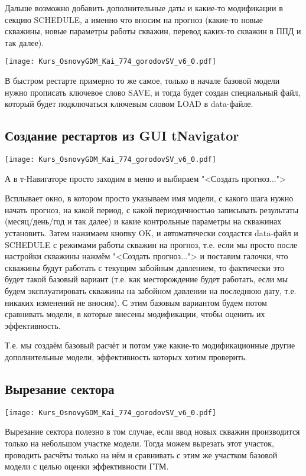 \documentclass[main.tex]{subfiles}
\begin{document}
Дальше возможно добавить дополнительные даты и какие-то модификации в секцию SCHEDULE, а именно что вносим на прогноз (какие-то новые скважины, новые параметры работы скважин, перевод каких-то скважин в ППД и так далее).

\texttt{[image: Kurs\_OsnovyGDM\_Kai\_774\_gorodovSV\_v6\_0.pdf]}

В быстром рестарте примерно то же самое, только в начале базовой модели нужно прописать ключевое слово SAVE, и тогда будет создан специальный файл, который будет подключаться ключевым словом LOAD в data-файле.

\subsection{Создание рестартов из GUI tNavigator}

\texttt{[image: Kurs\_OsnovyGDM\_Kai\_774\_gorodovSV\_v6\_0.pdf]}

А в т-Навигаторе просто заходим в меню и выбираем "<Создать прогноз...">

Всплывает окно, в котором просто указываем имя модели, с какого шага нужно начать прогноз, на какой период, с какой периодичностью записывать результаты (месяц/день/год и так далее) и какие контрольные параметры на скважинах установить.
Затем нажимаем кнопку OK, и автоматически создастся data-файл и SCHEDULE с режимами работы скважин на прогноз, т.е. если мы просто после настройки скважины нажмём "<Создать прогноз..."> и поставим галочки, что скважины будут работать с текущим забойным давлением, то фактически это будет такой базовый вариант (т.е. как месторождение будет работать, если мы будем эксплуатировать скважины на забойном давлении на последнюю дату, т.е. никаких изменений не вносим).
С этим базовым вариантом будем потом сравнивать модели, в которые внесены модификации, чтобы оценить их эффективность.

Т.е. мы создаём базовый расчёт и потом уже какие-то модификационные другие дополнительные модели, эффективность которых хотим проверить.

\subsection{Вырезание сектора}

\texttt{[image: Kurs\_OsnovyGDM\_Kai\_774\_gorodovSV\_v6\_0.pdf]}

Вырезание сектора полезно в том случае, если ввод новых скважин производится только на небольшом участке модели.
Тогда можем вырезать этот участок, проводить расчёты только на нём и сравнивать с этим же участком базовой модели с целью оценки эффективности ГТМ.
\\
\end{document}
